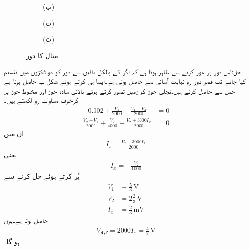 \begin{figure}
\begin{subfigure}{1\textwidth}
\caption*{(پ)}
\end{subfigure}
\begin{subfigure}{0.5\textwidth}
\centering
{}
\caption*{(ت)}
\end{subfigure}%
\begin{subfigure}{0.5\textwidth}
\centering
{}
\caption*{(ٹ)}
\end{subfigure}%
\caption{مثال  کا دور۔}
\label{شکل_مسئلہ_طاقت_منتقلی_ب}
\end{figure}

حل:اس دور پر غور کرنے سے ظاہر ہوتا ہے کہ اگر  کے بالکل دائیں سے دور کو دو ٹکڑوں میں تقسیم کیا جائے تب قصر دور رو نہایت آسانی سے حاصل ہوتی ہے۔ایسا ہی کرتے ہوئے شکل-ب حاصل ہوتا ہے جس سے  حاصل کرتے ہیں۔نچلی جوڑ کو زمین تصور کرتے ہوئے بالائی سادہ جوڑ اور مخلوط جوڑ پر کرخوف مساوات رو لکھتے ہیں۔
\begin{align*}
-0.002+\frac{V_1}{2000}+\frac{V_1-V_2}{2000}&=0\\
\frac{V_2-V_1}{2000}+\frac{V_2}{4000}+\frac{V_2+3000I_x}{2000}&=0
\end{align*}
ان میں
\begin{align*}
I_x=\frac{V_2+3000I_x}{2000}
\end{align*}
یعنی
\begin{align*}
I_x=-\frac{V_2}{1000}
\end{align*}
پُر کرتے ہوئے حل کرنے سے
\begin{align*}
V_1&=\frac{5}{3}\, \si{\volt}\\
V_2&=2\frac{2}{3}\, \si{\volt}\\
I_x&=\frac{2}{3}\, \si{\milli\volt}
\end{align*}
حاصل ہوتا ہے۔یوں
\begin{align*}
V_{\text{کھلا}}=2000 I_x=\frac{4}{3}\, \si{\volt}
\end{align*}
ہو گا۔

